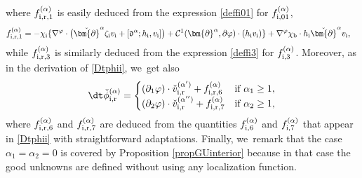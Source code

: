 where $f_{{\rm i},{\rm r},1}^{(\alpha)}$ is easily deduced from the expression \eqref{deffi01} for $f_{{\rm i},01}^{(\alpha)}$,
\begin{align*}
f_{{\rm i},{\rm r},1}^{(\alpha)}
&= -\chi_\mathrm{i}\{ \nabla^\varphi\cdot\bigl(\check{\bm{\partial}}^\alpha\zeta_\mathrm{i} v_\mathrm{i}
+ [\mathfrak{d}^\alpha;h_\mathrm{i},v_\mathrm{i}] \bigr)
+ {\mathcal C}^1(\bm{\partial}^\alpha,\partial\varphi)\cdot(h_\mathrm{i}v_\mathrm{i}) \}
+ \nabla^\varphi\chi_\mathrm{b}\cdot h_\mathrm{i} \check{\bm{\partial}}^\alpha v_\mathrm{i} ,
\end{align*}
while $f_{{\rm i},{\rm r},3}^{(\alpha)}$ is similarly deduced from the expression \eqref{deffi3} for $f_{{\rm i},3}^{(\alpha)}$.
Moreover, as in the derivation of \eqref{Dtphii}, we~get also
\begin{equation}\label{Dtphiir}
\dt\check{\phi}_\mathrm{i,r}^{(\alpha)} =
\begin{cases}
(\partial_1\varphi)\cdot\check{v}_\mathrm{i,r}^{(\alpha')} + f_{{\rm i,r},6}^{(\alpha)} &\mbox{if } \alpha_1\geq1, \\
(\partial_2\varphi)\cdot\check{v}_\mathrm{i,r}^{(\alpha'')} + f_{{\rm i,r},7}^{(\alpha)} &\mbox{if } \alpha_2\geq1,
\end{cases}
\end{equation}
where $f_{{\rm i,r},6}^{(\alpha)}$ and $f_{{\rm i,r},7}^{(\alpha)}$ are deduced from the quantities $f_{{\rm i},6}^{(\alpha)}$ and
$f_{{\rm i},7}^{(\alpha)}$ that appear in \eqref{Dtphii} with straightforward adaptations.
Finally, we~remark that the case $\alpha_1=\alpha_2=0$ is covered by Proposition \ref{propGUinterior}
because in that case the good unknowns are defined without using any localization function.

